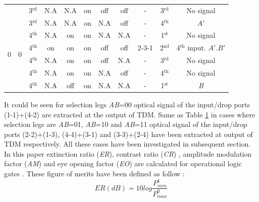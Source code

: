 \documentclass{osa-article}
\begin{document}
\begin{table}[H]
{\begin{tabular}{c|c|c|c|c|c|c|c|c|c|c}
\cline{3-11}
& & 3$^{\text{rd}}$& N.A& N.A& on&off& off& -& 3$^{\text{rd}}$& No signal\\
\cline{3-11}
& & 3$^{\text{rd}}$& N.A& N.A& on& N.A& off& -& 4$^{\text{th}}$& $A'$\\
\hline 
\multirow{4}{*}{0}& \multirow{4}{*}{0}& 4$^{\text{th}}$& N.A& on& on& N.A& N.A&-& 1$^{\text{st}}$& No signal\\
\cline{3-11}
& & 4$^{\text{th}}$& on& on& on& off& off& 2-3-1& 2$^{\text{nd}}$&4$^{\text{th}}$ input. $A'$.$B'$\\
\cline{3-11}
& & 4$^{\text{th}}$& N.A& on& on& off& N.A& -& 3$^{\text{rd}}$& No signal\\ 
\cline{3-11}
& & 4$^{\text{th}}$& N.A& on& on& N.A& off& -& 4$^{\text{th}}$& No signal\\
\cline{3-11}
& & 4$^{\text{th}}$& N.A& off& on& N.A& N.A& -& 1$^{\text{st}}$& \textit B\\
\hline 
\end{tabular}
}
\label{tab2} %
\end{table}

It could be seen for selection legs \textit{A}\textit{B}=00 optical signal of the input/drop ports (1-1)+(4-2) are extracted at the output of TDM. Same as Table \ref{tab2} in cases where selection legs are  \textit{A}\textit{B}=01,  \textit{A}\textit{B}=10 and  \textit{A}\textit{B}=11 optical signal of the input/drop ports (2-2)+(1-3), (4-4)+(3-1) and (3-3)+(2-4) have been extracted at output of TDM respectively. All these cases have been investigated in subsequent section.\\
In this paper extinction ratio (\textit {ER}), contrast ratio (\textit {CR}) , amplitude modulation factor (\textit {AM}) and eye opening factor (\textit {EO}) are calculated for operational logic gates \cite{houbavlis2004performance}. These figure of merits have been defined as follow :
\begin{equation}
ER(dB)=10log\frac{P^1_{min}} {P^0_{max}}
\label{eq:1}
\end{equation}
\end{document}
